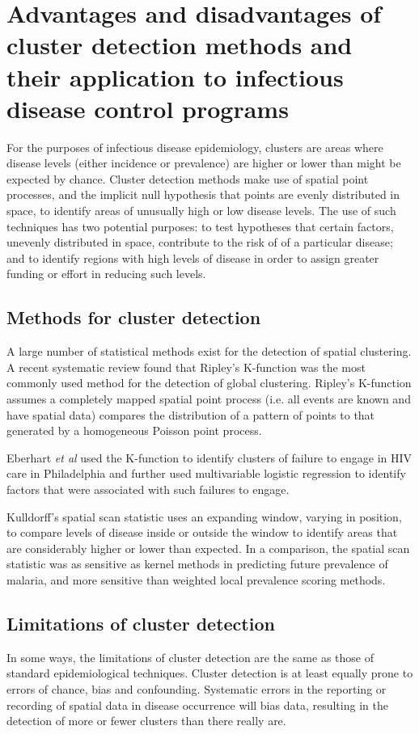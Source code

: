 \documentclass[11pt,a4paper]{article}
\begin{document}
\section{Advantages and disadvantages of cluster detection methods and their application to infectious disease control programs}

For the purposes of infectious disease epidemiology, clusters are areas where disease levels (either incidence or prevalence) are higher or lower than might be expected by chance.
Cluster detection methods make use of spatial point processes, and the implicit null hypothesis that points are evenly distributed in space, to identify areas of unusually high or low disease levels.
The use of such techniques has two potential purposes: to test hypotheses that certain factors, unevenly distributed in space, contribute to the risk of of a particular disease; and to identify regions with high levels of disease in order to assign greater funding or effort in reducing such levels.

\subsection{Methods for cluster detection}
A large number of statistical methods exist for the detection of spatial clustering. 
A recent systematic review found that Ripley's K-function was the most commonly used method for the detection of global clustering. \cite{Fritz2013}
Ripley's K-function assumes a completely mapped spatial point process (i.e. all events are known and have spatial data) compares the distribution of a pattern of points to that generated by a homogeneous Poisson point process. \cite{Dixon2002} 

Eberhart \textit{et al} used the K-function to identify clusters of failure to engage in HIV care in Philadelphia and further used multivariable logistic regression to identify factors that were associated with such failures to engage. \cite{Eberhart2013}

Kulldorff's spatial scan statistic uses an expanding window, varying in position, to compare levels of disease inside or outside the window to identify areas that are considerably higher or lower than expected.\cite{Kulldorff1995} 
In a comparison, the spatial scan statistic was as sensitive as kernel methods in predicting future prevalence of malaria, and more sensitive than weighted local prevalence scoring methods. \cite{Mosha2014}

\subsection{Limitations of cluster detection}
In some ways, the limitations of cluster detection are the same as those of standard epidemiological techniques. 
Cluster detection is at least equally prone to errors of chance, bias and confounding. 
Systematic errors in the reporting or recording of spatial data in disease occurrence will bias data, resulting in the detection of more or fewer clusters than there really are. 
\end{document}

